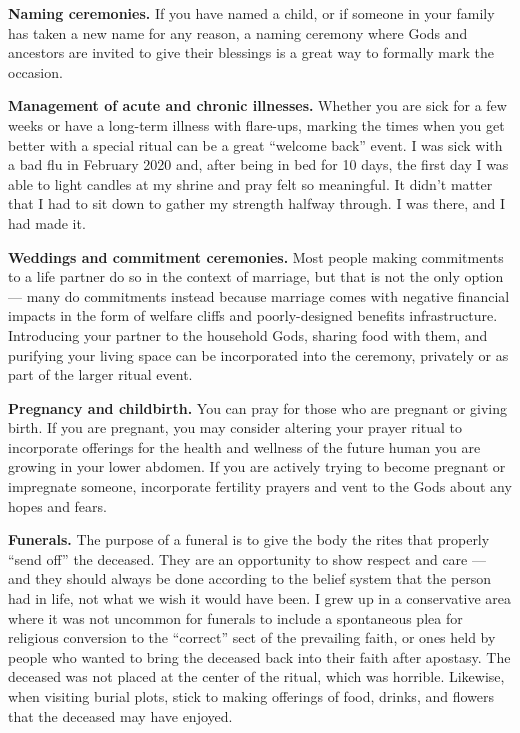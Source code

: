 \documentclass[
]{book}
\begin{document}
\textbf{Naming ceremonies.} If you have named a child, or if someone in your family has taken a new name for any reason, a naming ceremony where Gods and ancestors are invited to give their blessings is a great way to formally mark the occasion.

\textbf{Management of acute and chronic illnesses.} Whether you are sick for a few weeks or have a long-term illness with flare-ups, marking the times when you get better with a special ritual can be a great ``welcome back'' event. I was sick with a bad flu in February 2020 and, after being in bed for 10 days, the first day I was able to light candles at my shrine and pray felt so meaningful. It didn't matter that I had to sit down to gather my strength halfway through. I was there, and I had made it.

\textbf{Weddings and commitment ceremonies.} Most people making commitments to a life partner do so in the context of marriage, but that is not the only option --- many do commitments instead because marriage comes with negative financial impacts in the form of welfare cliffs and poorly-designed benefits infrastructure. Introducing your partner to the household Gods, sharing food with them, and purifying your living space can be incorporated into the ceremony, privately or as part of the larger ritual event.

\textbf{Pregnancy and childbirth.} You can pray for those who are pregnant or giving birth. If you are pregnant, you may consider altering your prayer ritual to incorporate offerings for the health and wellness of the future human you are growing in your lower abdomen. If you are actively trying to become pregnant or impregnate someone, incorporate fertility prayers and vent to the Gods about any hopes and fears.

\textbf{Funerals.} The purpose of a funeral is to give the body the rites that properly ``send off'' the deceased. They are an opportunity to show respect and care --- and they should always be done according to the belief system that the person had in life, not what we wish it would have been. I grew up in a conservative area where it was not uncommon for funerals to include a spontaneous plea for religious conversion to the ``correct'' sect of the prevailing faith, or ones held by people who wanted to bring the deceased back into their faith after apostasy. The deceased was not placed at the center of the ritual, which was horrible. Likewise, when visiting burial plots, stick to making offerings of food, drinks, and flowers that the deceased may have enjoyed.
\end{document}
